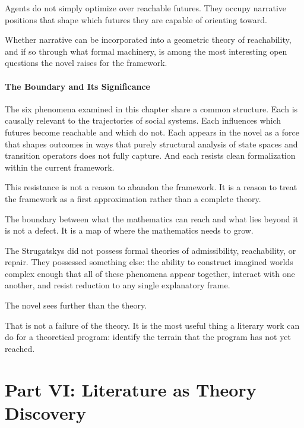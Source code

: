 \documentclass[12pt, a4paper]{article}
\theoremstyle{plain}
\theoremstyle{definition}
\theoremstyle{remark}
\begin{document}
Agents do not simply optimize over reachable
futures. They occupy narrative positions that shape
which futures they are capable of orienting toward.

Whether narrative can be incorporated into a
geometric theory of reachability, and if so through
what formal machinery, is among the most
interesting open questions the novel raises for
the framework.

\subsection{The Boundary and Its Significance}

The six phenomena examined in this chapter share
a common structure. Each is causally relevant to
the trajectories of social systems. Each influences
which futures become reachable and which do not.
Each appears in the novel as a force that shapes
outcomes in ways that purely structural analysis
of state spaces and transition operators does not
fully capture. And each resists clean formalization
within the current framework.

This resistance is not a reason to abandon the
framework. It is a reason to treat the framework
as a first approximation rather than a complete
theory.

The boundary between what the mathematics can
reach and what lies beyond it is not a defect.
It is a map of where the mathematics needs to grow.

The Strugatskys did not possess formal theories
of admissibility, reachability, or repair. They
possessed something else: the ability to construct
imagined worlds complex enough that all of these
phenomena appear together, interact with one
another, and resist reduction to any single
explanatory frame.

The novel sees further than the theory.

That is not a failure of the theory. It is the
most useful thing a literary work can do for a
theoretical program: identify the terrain that
the program has not yet reached.

\newpage
\part*{Part VI: Literature as Theory Discovery}
\end{document}
